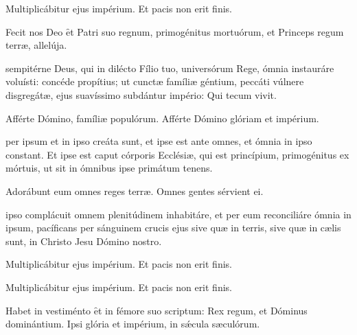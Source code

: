 \documentclass[fontsize=8pt,paper=A6,twoside,BCOR=1mm,DIV=22,headinclude]{scrarticle}
\begin{document}
\begin{multicols}{2}
{}

{
\V Multiplicábitur ejus impérium.
\R Et pacis non erit finis.

\B Fecit nos Deo \f et Patri suo regnum, primogénitus mortuórum, et Princeps regum terræ, allelúja.

 sempitérne Deus, qui in dilécto Fílio tuo, universórum Rege, ómnia instauráre voluísti: concéde propítius; ut cunctæ famíliæ géntium, peccáti vúlnere disgregátæ, ejus suavíssimo subdántur império: Qui tecum vivit.




\V Afférte Dómino, famíliæ populórum.
\R Afférte Dómino glóriam et impérium.

}


 per ipsum et in ipso creáta sunt, et ipse est ante omnes, et ómnia in ipso constant. Et ipse est caput córporis Ecclésiæ, qui est princípium, primogénitus ex mórtuis, ut sit in ómnibus ipse primátum tenens.

\V Adorábunt eum omnes reges terræ.
\R Omnes gentes sérvient ei.


 ipso complácuit omnem plenitúdinem inhabitáre, et per eum reconciliáre ómnia in ipsum, pacíficans per sánguinem crucis ejus sive quæ in terris, sive quæ in cælis sunt, in Christo Jesu Dómino nostro.

\V Multiplicábitur ejus impérium.
\R Et pacis non erit finis.



\V Multiplicábitur ejus impérium.
\R Et pacis non erit finis.

\M Habet in vestiménto \f et in fémore suo scriptum: Rex regum, et Dóminus dominántium. Ipsi glória et impérium, in sǽcula sæculórum.




\end{multicols}

\end{document}
